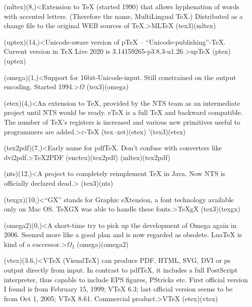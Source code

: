 {	\tonode(mltex)(8,\layer)<Extension to TeX (started 1990) that allows hyphenation of words with accented letters. (Therefore the name, MultiLingual TeX.) Distributed as a change file to the original WEB sources of TeX.>{ML\TeX}
	\todraw(tex3)(mltex)
	\steplayer[-.5]	
	
	\tonode[\experimental](uptex)(14,\layer)<Unicode-aware version of pTeX – “Unicode-publishing”-TeX. Current version in TeX Live 2020 is 3.14159265-p3.8.3-u1.26.>{up\TeX}
		\todraw(ptex)(uptex)
	\steplayer[-1.5]

	\tonode[\experimental](omega)(1,\layer)<Support for 16bit-Unicode-input. Still constrained on the output encoding. Started 1994.>{$\Omega$}
		\todraw(tex3)(omega)
	
	\tonode[\vip](etex)(4,\layer)<An extension to TeX, provided by the NTS team as an intermediate project until NTS would be ready. eTeX is a full TeX and backward compatible. The number of TeX's registers is increased and various new primitives useful to programmers are added.>{$\varepsilon$-\TeX}
		\todraw(tex--xet)(etex)
		\todraw'(tex3)(etex)

	\tonode(tex2pdf)(7,\layer)<Early name for pdfTeX. Don't confuse with converters like dvi2pdf.>{\TeX2PDF}
		\todraw(enctex)(tex2pdf)
		\todraw(mltex)(tex2pdf)
	
	\tonode(nts)(12,\layer)<A project to completely reimplement TeX in Java. Now NTS is officially declared dead.>{\NTS}
		\todraw(tex3)(nts)

	\steplayer[-1]

	\tonode(texgx)(10,\layer)<“GX” stands for Graphic eXtension, a font technology available only on Mac OS. TeXGX was able to handle these fonts.>{\TeX{}gX}
		\todraw(tex3)(texgx)

	\steplayer[-1]

	\tonode[\experimental](omega2)(0,\layer)<A short-time try to pick up the development of Omega again in 2006. Seemed more like a good plan and is now regarded as obsolete. LuaTeX is kind of a successor.>{$\Omega_2$}
		\todraw(omega)(omega2)

	\steplayer[-0.5]
	
	\tonode[\experimental](vtex)(3.6,\layer)<VTeX (VisualTeX) can produce PDF, HTML, SVG, DVI or ps output directly from input. In contrast to pdfTeX, it includes a full PostScript interpreter, thus capable to include EPS figures, PStricks etc. First official version I found is from February 15, 1999; VTeX 6.3; last official version seems to be from Oct 1, 2005; VTeX 8.61. Commercial product.>{V\TeX}
		\todraw(etex)(vtex)

}
